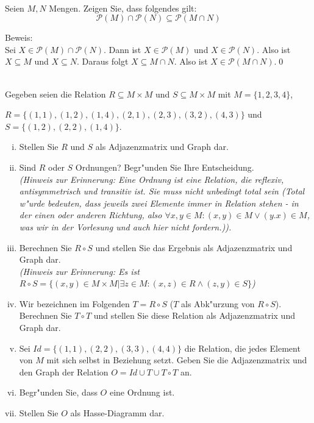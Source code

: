 \\
Seien $M,N$ Mengen. Zeigen Sie, dass folgendes gilt:
\[\mathscr{P}(M)\cap\mathscr{P}(N)\subseteq \mathscr{P}(M\cap N)\]

\begin{loesung}
Beweis:\\
Sei $X\in\mathscr{P}(M)\cap\mathscr{P}(N)$. Dann ist $X\in\mathscr{P}(M)$ und $X\in\mathscr{P}(N)$. Also ist $X\subseteq M$ und $X\subseteq N$. Daraus folgt $X\subseteq M\cap N$. Also ist $X\in\mathscr{P}(M\cap N)$.\qed
\end{loesung}

\\
Gegeben seien die Relation $R\subseteq M\times M$ und $S\subseteq M\times M$ mit $M=\{1,2,3,4\}$, 

$R=\{(1,1),(1,2),(1,4),(2,1),(2,3),(3,2),(4,3)\}$ und $S=\{(1,2),(2,2),(1,4)\}$.
\begin{enumerate}[(i)]
\item Stellen Sie $R$ und $S$ als Adjazenzmatrix und Graph dar.
\item Sind $R$ oder $S$ Ordnungen? Begr"unden Sie Ihre Entscheidung.\\
\textit{(Hinweis zur Erinnerung: Eine Ordnung ist eine Relation, die reflexiv, antisymmetrisch und transitiv ist. Sie muss nicht unbedingt total sein (Total w"urde bedeuten, dass jeweils zwei Elemente immer in Relation stehen - in der einen oder anderen Richtung, also $\forall x,y\in M:(x,y)\in M\vee (y.x)\in M$, was wir in der Vorlesung und auch hier nicht fordern.)).}
\item Berechnen Sie $R\circ S$ und stellen Sie das Ergebnis als Adjazenzmatrix und Graph dar.\\
\textit{(Hinweis zur Erinnerung: Es ist $R\circ S=\{(x,y)\in M\times M|\exists z\in M: (x,z)\in R\wedge (z,y)\in S\}$)}
\item Wir bezeichnen im Folgenden $T=R\circ S$ ($T$ als Abk"urzung von $R\circ S$). Berechnen Sie $T\circ T$ und stellen Sie diese Relation als Adjazenzmatrix und Graph dar.
\item Sei $Id=\{(1,1),(2,2),(3,3),(4,4)\}$ die Relation, die jedes Element von $M$ mit sich selbst in Beziehung setzt. Geben Sie die Adjazenzmatrix und den Graph der Relation $O=Id\cup T\cup T\circ T$ an.
\item Begr"unden Sie, dass $O$ eine Ordnung ist.
\item Stellen Sie $O$ als Hasse-Diagramm dar.

\end{enumerate}

